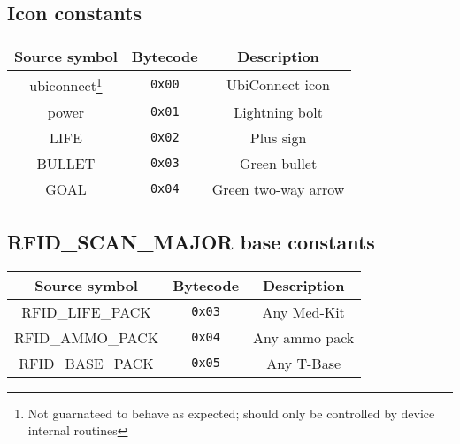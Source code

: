 \documentclass[12pt,a4paper]{scrbook}
\begin{document}
\subsection{Icon constants}
\label{sec:iconconstants}
\begin{minipage}{\linewidth}
\renewcommand{\thefootnote}{\thempfootnote}
\begin{center}
  \begin{tabular}{ | c | c || c | }
    \hline
    Source symbol & Bytecode	 & Description \\ \hline \hline
    ubiconnect\footnote{Not guarnateed to behave as expected; should only be controlled by device 
   		 internal routines} 	& \texttt{0x00} & UbiConnect icon \\ \hline
    power\footnotemark[\value{footnote}] 		& \texttt{0x01} & Lightning bolt \\ \hline
    LIFE						& \texttt{0x02} & Plus sign  \\ \hline
    BULLET 						& \texttt{0x03} & Green bullet  \\ \hline
    GOAL 						& \texttt{0x04} & Green two-way arrow  \\ \hline
  \end{tabular}
\end{center}
\end{minipage}

\subsection{RFID\_SCAN\_MAJOR base constants}
\label{sec:rfidconstants}
\begin{minipage}{\linewidth}
\renewcommand{\thefootnote}{\thempfootnote}
\begin{center}
  \begin{tabular}{ | c | c || c | }
    \hline
    Source symbol & Bytecode	 & Description \\ \hline \hline
    RFID\_LIFE\_PACK	& \texttt{0x03}	& Any Med-Kit  \\ \hline
    RFID\_AMMO\_PACK	& \texttt{0x04}	& Any ammo pack  \\ \hline
    RFID\_BASE\_PACK	& \texttt{0x05}	& Any T-Base  \\ \hline
  \end{tabular}
\end{center}
\end{minipage}
\end{document}
